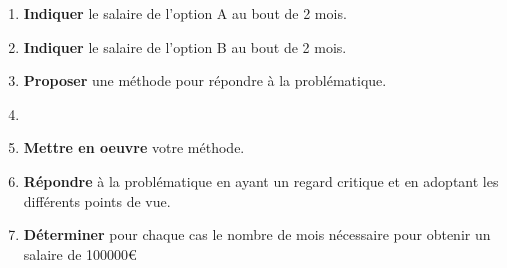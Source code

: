 \documentclass[12pt,a4paper,oneside,dvipsnames,table,svgnames,skins,theorems]{report}
\begin{document}
\begin{enumerate}
\item \textbf{Indiquer} le salaire de l'option A au bout de 2 mois.


\item \textbf{Indiquer} le salaire de l'option B au bout de 2 mois.


\item \textbf{Proposer} une méthode pour répondre à la problématique. 


\vspace{0.5cm}

\item {} 
\vspace{0.5cm}

\item \textbf{Mettre en oeuvre} votre méthode.




\vspace{0.5cm}

\item \textbf{Répondre} à la problématique  en ayant un regard critique et en adoptant les différents points de vue. 


\item \textbf{Déterminer} pour chaque cas le nombre de mois nécessaire pour obtenir un salaire de 100000\euro{}
\end{enumerate}
\end{document}
